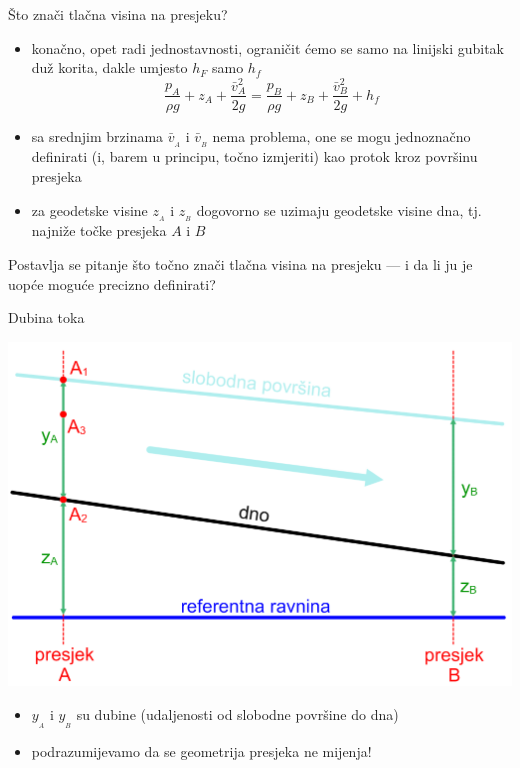 \documentclass{beamer}
\begin{document}
\begin{frame}{Što znači tlačna visina na presjeku?}

\begin{itemize}
\item konačno, opet radi jednostavnosti, ograničit ćemo se samo na linijski
gubitak duž korita, dakle umjesto $h_{F}$ samo $h_{f}$
\[
\frac{p_{{\scriptscriptstyle A}}}{\rho g}+z_{{\scriptscriptstyle A}}+\frac{\bar{v}_{{\scriptscriptstyle A}}^{2}}{2g}=\frac{p_{{\scriptscriptstyle B}}}{\rho g}+z_{{\scriptscriptstyle B}}+\frac{\bar{v}_{{\scriptscriptstyle B}}^{2}}{2g}+h_{f}
\]
\item sa srednjim brzinama $\bar{v}_{_{A}}$ i $\bar{v}_{_{B}}$ nema problema,
one se mogu jednoznačno definirati (i, barem u principu, točno izmjeriti)
kao protok kroz površinu presjeka
\item za geodetske visine $z_{_{A}}$ i $z_{_{B}}$ dogovorno se uzimaju
geodetske visine dna, tj. najniže točke presjeka $A$ i $B$
\end{itemize}
\begin{block}{}
Postavlja se pitanje što točno znači tlačna visina na presjeku ---
i da li ju je uopće moguće precizno definirati? 
\end{block}
\end{frame}

\begin{frame}{Dubina toka}

\begin{center}
\includegraphics[height=0.5\paperheight]{slike/MF-10-slika1.PNG}
\par\end{center}
\begin{itemize}
\item $y_{_{A}}$ i $y_{_{B}}$ su dubine (udaljenosti od slobodne površine
do dna)
\item podrazumijevamo da se geometrija presjeka ne mijenja!
\end{itemize}
\end{frame}
\end{document}
